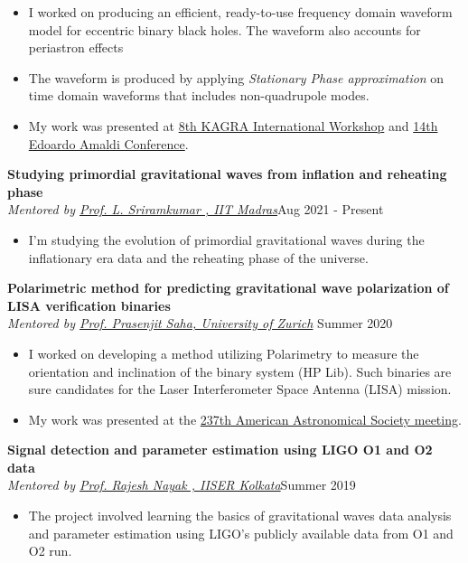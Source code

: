 \documentclass[margin, centered]{res}
\begin{document}
\begin{resume}
\begin{itemize}
    \item I worked on producing an efficient, ready-to-use frequency domain waveform model for eccentric binary black holes. The waveform also accounts for periastron effects 
    \item The waveform is produced by applying \emph{Stationary Phase approximation} on time domain waveforms that includes non-quadrupole modes.
    \item My work was presented at \href{http://kiw8.org/program/}{8th KAGRA International Workshop}  and \href{https://www.amaldi14.org/}{14th Edoardo Amaldi Conference}.
\end{itemize}

\textbf{Studying primordial gravitational waves from inflation and reheating phase} \\
\emph{Mentored by \href{https://physics.iitm.ac.in/~sriram/index.html}{Prof. L. Sriramkumar , IIT Madras}}\hfill Aug 2021 - Present
\begin{itemize}
    \item I'm studying the evolution of primordial gravitational waves during the inflationary era data and the reheating phase of the universe. 
\end{itemize}


\textbf{Polarimetric method for predicting gravitational wave polarization of LISA verification binaries} \\
\emph{Mentored by \href{https://www.ctac.uzh.ch/en/Research/research-groups/Prasenjit-Saha.html}{Prof. Prasenjit Saha, University of Zurich} }\hfill Summer 2020 

\begin{itemize}
    \item I worked on developing a method utilizing Polarimetry to measure the orientation and inclination of the binary system (HP Lib). Such binaries are sure candidates for the  Laser Interferometer Space Antenna (LISA) mission.
    \item My work was presented at the \href{https://aas.org/meetings/aas237}{237th American Astronomical Society meeting}.
\end{itemize}


\textbf{Signal detection and parameter estimation using LIGO O1 and O2 data} \\
\emph{Mentored by \href{https://www.iiserkol.ac.in/~rajesh/}{Prof. Rajesh Nayak , IISER Kolkata}}\hfill Summer 2019
\begin{itemize}
    \item The project involved learning the basics of gravitational waves data analysis and parameter estimation using LIGO's publicly available data from O1 and O2 run.
\end{itemize}




\end{resume}
\end{document}
